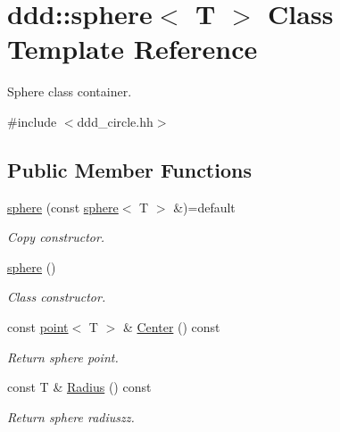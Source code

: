 \hypertarget{classddd_1_1sphere}{}\section{ddd\+:\+:sphere$<$ T $>$ Class Template Reference}
\label{classddd_1_1sphere}


Sphere class container.  




{\ttfamily \#include $<$ddd\+\_\+circle.\+hh$>$}

\subsection*{Public Member Functions}
\begin{DoxyCompactItemize}
\item 
\mbox{\label{classddd_1_1sphere_ac434fad67b03cf195558e2b2185e6b42}} 
\hyperlink{classddd_1_1sphere_ac434fad67b03cf195558e2b2185e6b42}{sphere} (const \hyperlink{classddd_1_1sphere}{sphere}$<$ T $>$ \&)=default
\begin{DoxyCompactList}\small\item\em Copy constructor. \end{DoxyCompactList}\item 
\mbox{\label{classddd_1_1sphere_aedcf4e205c6f6ce5f23ab63de4dbb0ac}} 
\hyperlink{classddd_1_1sphere_aedcf4e205c6f6ce5f23ab63de4dbb0ac}{sphere} ()
\begin{DoxyCompactList}\small\item\em Class constructor. \end{DoxyCompactList}\item 
\mbox{\label{classddd_1_1sphere_ae6804085242cdbdc51633b2507944e31}} 
const \hyperlink{classddd_1_1point}{point}$<$ T $>$ \& \hyperlink{classddd_1_1sphere_ae6804085242cdbdc51633b2507944e31}{Center} () const
\begin{DoxyCompactList}\small\item\em Return sphere point. \end{DoxyCompactList}\item 
\mbox{\label{classddd_1_1sphere_a739abf2e15cd66120dbe306153c35caa}} 
const T \& \hyperlink{classddd_1_1sphere_a739abf2e15cd66120dbe306153c35caa}{Radius} () const
\begin{DoxyCompactList}\small\item\em Return sphere radiuszz. \end{DoxyCompactList}\end{DoxyCompactItemize}



